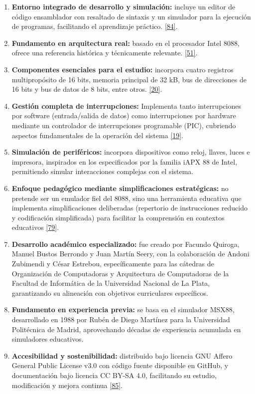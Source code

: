 \documentclass[12pt,oneside]{templates/unerthesis}
\begin{document}
\begin{enumerate}
\def\labelenumi{\arabic{enumi}.}
\item
  \textbf{Entorno integrado de desarrollo y simulación:} incluye un editor de código ensamblador con resaltado de sintaxis y un simulador para la ejecución de programas, facilitando el aprendizaje práctico. \protect\hyperlink{ref-vonsim}{{[}84{]}}.
\item
  \textbf{Fundamento en arquitectura real:} basado en el procesador Intel 8088, ofrece una referencia histórica y técnicamente relevante. \protect\hyperlink{ref-intel8086manual}{{[}51{]}}.
\item
  \textbf{Componentes esenciales para el estudio:} incorpora cuatro registros multipropósito de 16 bits, memoria principal de 32 kB, bus de direcciones de 16 bits y bus de datos de 8 bits, entre otros. \protect\hyperlink{ref-stallings_computer_2021}{{[}20{]}}.
\item
  \textbf{Gestión completa de interrupciones:} Implementa tanto interrupciones por software (entrada/salida de datos) como interrupciones por hardware mediante un controlador de interrupciones programable (PIC), cubriendo aspectos fundamentales de la operación del sistema \protect\hyperlink{ref-hennessy2017computer}{{[}19{]}}.
\item
  \textbf{Simulación de periféricos:} incorpora dispositivos como reloj, llaves, luces e impresora, inspirados en los especificados por la familia iAPX 88 de Intel, permitiendo simular interacciones complejas con el sistema.
\item
  \textbf{Enfoque pedagógico mediante simplificaciones estratégicas:} no pretende ser un emulador fiel del 8088, sino una herramienta educativa que implementa simplificaciones deliberadas (repertorio de instrucciones reducido y codificación simplificada) para facilitar la comprensión en contextos educativos \protect\hyperlink{ref-patt2019introduction}{{[}79{]}}.
\item
  \textbf{Desarrollo académico especializado:} fue creado por Facundo Quiroga, Manuel Bustos Berrondo y Juan Martín Seery, con la colaboración de Andoni Zubimendi y César Estrebou, específicamente para las cátedras de Organización de Computadoras y Arquitectura de Computadoras de la Facultad de Informática de la Universidad Nacional de La Plata, garantizando su alineación con objetivos curriculares específicos.
\item
  \textbf{Fundamento en experiencia previa:} se basa en el simulador MSX88, desarrollado en 1988 por Rubén de Diego Martínez para la Universidad Politécnica de Madrid, aprovechando décadas de experiencia acumulada en simuladores educativos.
\item
  \textbf{Accesibilidad y sostenibilidad:} distribuido bajo licencia GNU Affero General Public License v3.0 con código fuente disponible en GitHub, y documentación bajo licencia CC BY-SA 4.0, facilitando su estudio, modificación y mejora continua \protect\hyperlink{ref-opensource_licensing_2024}{{[}85{]}}.
\end{enumerate}
\end{document}
